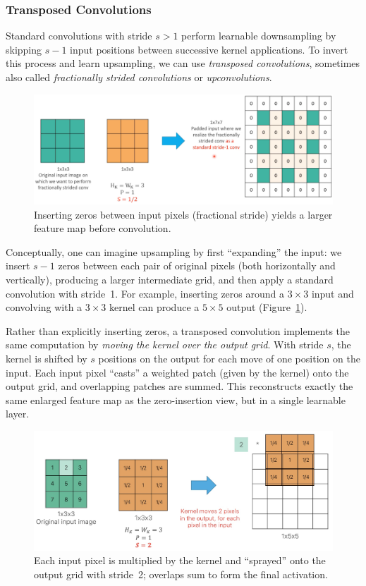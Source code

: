 \subsubsection{Transposed Convolutions}

Standard convolutions with stride \(s>1\) perform learnable downsampling by skipping \(s-1\) input positions between successive kernel applications. To invert this process and learn upsampling, we can use \emph{transposed convolutions}, sometimes also called \emph{fractionally strided convolutions} or \emph{upconvolutions}.

\begin{figure}[htbp]
  \centering
  \includegraphics[width=0.7\linewidth]{./img/fractional_conv.png}
  \caption{Inserting zeros between input pixels (fractional stride) yields a larger feature map before convolution.}
  \label{fig:fractional_conv}
\end{figure}

Conceptually, one can imagine upsampling by first “expanding” the input: we insert \(s-1\) zeros between each pair of original pixels (both horizontally and vertically), producing a larger intermediate grid, and then apply a standard convolution with stride~1. For example, inserting zeros around a \(3\times3\) input and convolving with a \(3\times3\) kernel can produce a \(5\times5\) output (Figure~\ref{fig:fractional_conv}).

Rather than explicitly inserting zeros, a transposed convolution implements the same computation by \emph{moving the kernel over the output grid}.  With stride \(s\), the kernel is shifted by \(s\) positions on the output for each move of one position on the input.  Each input pixel “casts” a weighted patch (given by the kernel) onto the output grid, and overlapping patches are summed.  This reconstructs exactly the same enlarged feature map as the zero-insertion view, but in a single learnable layer.

\begin{figure}[htbp]
  \centering
  \includegraphics[width=0.7\linewidth]{./img/transposed_conv.jpg}
  \caption{Each input pixel is multiplied by the kernel and “sprayed” onto the output grid with stride~2; overlaps sum to form the final activation.}
\end{figure}

